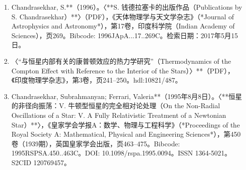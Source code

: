 \begin{enumerate}
\item Chandrasekhar, S.**（1996）。〈**S. 钱德拉塞卡的出版作品（Publications by S. Chandrasekhar）**〉（PDF），《天体物理学与天文学杂志》（*Journal of Astrophysics and Astronomy*），第17卷，印度科学院（Indian Academy of Sciences），页269。Bibcode: 1996JApA...17..269C。检索日期：2017年5月15日。
\item 〈“与恒星内部有关的康普顿效应的热力学研究”（Thermodynamics of the Compton Effect with Reference to the Interior of the Stars）〉**（PDF），《印度物理学杂志》，第3卷，页241–250。hdl:10821/487。
\item Chandrasekhar, Subrahmanyan; Ferrari, Valeria**（1995年8月8日）。〈**恒星的非径向振荡：V. 牛顿型恒星的完全相对论处理（On the Non-Radial Oscillations of a Star: V. A Fully Relativistic Treatment of a Newtonian Star）**〉，《皇家学会学报A：数学、物理与工程科学》（*Proceedings of the Royal Society A: Mathematical, Physical and Engineering Sciences*），第450卷（1939期），英国皇家学会出版，页463–475。Bibcode: 1995RSPSA.450..463C。DOI: 10.1098/rspa.1995.0094。ISSN 1364-5021。S2CID 120769457。
\end{enumerate}
